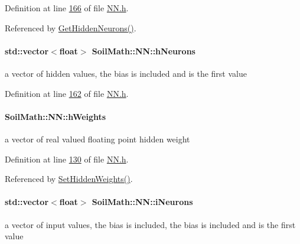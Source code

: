 Definition at line \hyperlink{_n_n_8h_source_l00166}{166} of file \hyperlink{_n_n_8h_source}{N\+N.\+h}.



Referenced by \hyperlink{_n_n_8h_source_l00143}{Get\+Hidden\+Neurons()}.

\hypertarget{class_soil_math_1_1_n_n_a459bde01ce33e0b27803cbe4a3b114b4}{}
\paragraph[{h\+Neurons}]{\setlength{\rightskip}{0pt plus 5cm}std\+::vector$<$float$>$ Soil\+Math\+::\+N\+N\+::h\+Neurons\hspace{0.3cm}{\ttfamily [private]}}\label{class_soil_math_1_1_n_n_a459bde01ce33e0b27803cbe4a3b114b4}
a vector of hidden values, the bias is included and is the first value 

Definition at line \hyperlink{_n_n_8h_source_l00162}{162} of file \hyperlink{_n_n_8h_source}{N\+N.\+h}.

\hypertarget{class_soil_math_1_1_n_n_a46db1b2814215509a7345fccc8928efe}{}
\paragraph[{h\+Weights}]{ Soil\+Math\+::\+N\+N\+::h\+Weights}\label{class_soil_math_1_1_n_n_a46db1b2814215509a7345fccc8928efe}
a vector of real valued floating point hidden weight 

Definition at line \hyperlink{_n_n_8h_source_l00130}{130} of file \hyperlink{_n_n_8h_source}{N\+N.\+h}.



Referenced by \hyperlink{_n_n_8h_source_l00095}{Set\+Hidden\+Weights()}.

\hypertarget{class_soil_math_1_1_n_n_aa5a6a6014722338fb8af2f79d6187998}{}
\paragraph[{i\+Neurons}]{\setlength{\rightskip}{0pt plus 5cm}std\+::vector$<$float$>$ Soil\+Math\+::\+N\+N\+::i\+Neurons\hspace{0.3cm}{\ttfamily [private]}}\label{class_soil_math_1_1_n_n_aa5a6a6014722338fb8af2f79d6187998}
a vector of input values, the bias is included, the bias is included and is the first value 

